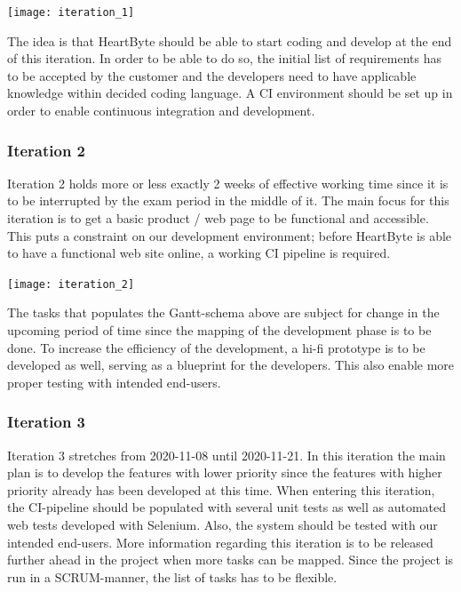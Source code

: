 \begin{center}
    \texttt{[image: iteration\_1]}
\end{center}
The idea is that HeartByte should be able to start coding and develop at the end of this iteration. In order to be able to do so, the initial list of requirements has to be accepted by the customer and the developers need to have applicable knowledge within decided coding language. A CI environment should be set up in order to enable continuous integration and development. 

\subsubsection{Iteration 2}
Iteration 2 holds more or less exactly 2 weeks of effective working time since it is to be interrupted by the exam period in the middle of it. The main focus for this iteration is to get a basic product / web page to be functional and accessible. This puts a constraint on our development environment; before HeartByte is able to have a functional web site online, a working CI pipeline is required. 
\begin{center}
    \texttt{[image: iteration\_2]}
\end{center}
The tasks that populates the Gantt-schema above are subject for change in the upcoming period of time since the mapping of the development phase is to be done. To increase the efficiency of the development, a hi-fi prototype is to be developed as well, serving as a blueprint for the developers. This also enable more proper testing with intended end-users. 

\subsubsection{Iteration 3}
Iteration 3 stretches from 2020-11-08 until 2020-11-21. In this iteration the main plan is to develop the features with lower priority since the features with higher priority already has been developed at this time. When entering this iteration, the CI-pipeline should be populated with several unit tests as well as automated web tests developed with Selenium. Also, the system should be tested with our intended end-users. \vspace{5mm}
More information regarding this iteration is to be released further ahead in the project when more tasks can be mapped. Since the project is run in a SCRUM-manner, the list of tasks has to be flexible. 


